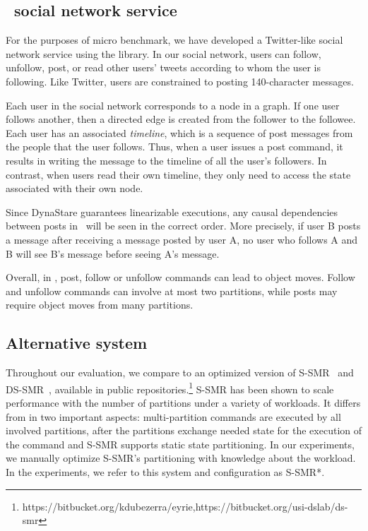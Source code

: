 \subsection{\appname\ social network service}
\label{sec:imp:\appname}

For the purposes of micro benchmark, we have developed a Twitter-like
social network service using the \dynastar{} library.  In our social
network, users can follow, unfollow, post, or read other users' tweets
according to whom the user is following. Like Twitter, users are
constrained to posting 140-character messages.

Each user in the social network corresponds to a node in a graph. If
one user follows another, then a directed edge is created from the
follower to the followee. Each user has an associated \emph{timeline},
which is a sequence of post messages from the people that the user
follows. Thus, when a user issues a post command, it results in
writing the message to the timeline of all the user's followers.  In
contrast, when users read their own timeline, they only need
to access the state associated with their own node.

Since DynaStare guarantees linearizable executions, any causal dependencies between posts in \appname\ will be seen in the correct order. 
More precisely, if user B posts a message after receiving a message posted by user A, no user who follows A and B will see B's message before seeing A's message.

Overall, in \appname, post, follow or unfollow commands can lead to
object moves.  Follow and unfollow commands can involve at most two
partitions, while posts may require object moves from many partitions.



\subsection{Alternative system}

Throughout our evaluation, we compare \dynastar{} to an optimized version of S-SMR~\cite{bezerra2014ssmr} and DS-SMR~\cite{hoang2016}, available in public repositories.\footnote{https://bitbucket.org/kdubezerra/eyrie,https://bitbucket.org/usi-dslab/ds-smr}
S-SMR has been shown to scale performance with the number of partitions under a variety of workloads.
It differs from \dynastar{} in two important aspects:
multi-partition commands are executed by all involved partitions, after the partitions exchange needed state for the execution of the command and S-SMR supports static state partitioning.
In our experiments, we manually optimize S-SMR's partitioning with knowledge about the workload.
In the experiments, we refer to this system and configuration as S-SMR*.

